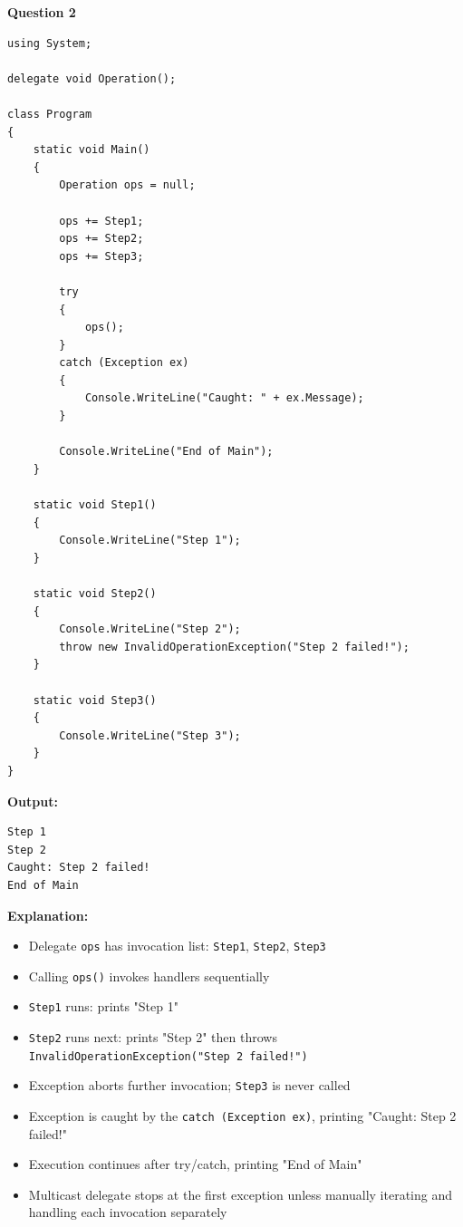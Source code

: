 \textbf{Question 2}

\begin{lstlisting}[language=CSharp, caption={Multicast Delegate Exception Handling}]
using System;

delegate void Operation();

class Program
{
    static void Main()
    {
        Operation ops = null;

        ops += Step1;
        ops += Step2;
        ops += Step3;

        try
        {
            ops();
        }
        catch (Exception ex)
        {
            Console.WriteLine("Caught: " + ex.Message);
        }

        Console.WriteLine("End of Main");
    }

    static void Step1()
    {
        Console.WriteLine("Step 1");
    }

    static void Step2()
    {
        Console.WriteLine("Step 2");
        throw new InvalidOperationException("Step 2 failed!");
    }

    static void Step3()
    {
        Console.WriteLine("Step 3");
    }
}
\end{lstlisting}

\textbf{Output:}
\begin{verbatim}
Step 1
Step 2
Caught: Step 2 failed!
End of Main
\end{verbatim}

\textbf{Explanation:}
\begin{itemize}
    \item Delegate \texttt{ops} has invocation list: \texttt{Step1}, \texttt{Step2}, \texttt{Step3}
    \item Calling \texttt{ops()} invokes handlers sequentially
    \item \texttt{Step1} runs: prints "Step 1"
    \item \texttt{Step2} runs next: prints "Step 2" then throws \texttt{InvalidOperationException("Step 2 failed!")}
    \item Exception aborts further invocation; \texttt{Step3} is never called
    \item Exception is caught by the \texttt{catch (Exception ex)}, printing "Caught: Step 2 failed!"
    \item Execution continues after try/catch, printing "End of Main"
    \item Multicast delegate stops at the first exception unless manually iterating and handling each invocation separately
\end{itemize}

